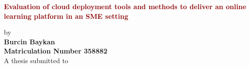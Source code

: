 \documentclass[twoside,11pt,titlepage,a4paper,english,bibliography=totocnumbered,listof=numbered]{scrbook}
\begin{document}
\frontmatter


\begin{titlepage}
	\strut
	\hfill
	\begin{center}
	\vspace{1cm}
		\Huge
		\begin{spacing}{.9}
			\textcolor{DarkRed}{\textbf{Evaluation of cloud deployment tools and methods to deliver an online learning platform in an SME setting}}\\
		\end{spacing}
		\vspace{0.8cm}
		\large
		by\\
		\vspace{0.8cm}
		\textbf{Burcin Baykan}\\
		\vspace{0.8cm}
		\textbf{Matriculation Number 358882}\\
		\vspace{2cm}
	 	A thesis submitted to\\

\end{center}
\end{titlepage}
\end{document}

